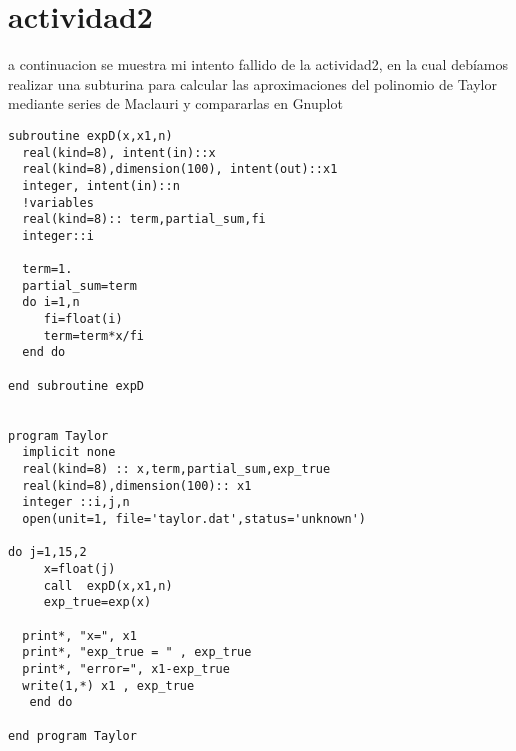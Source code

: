\documentclass{article}
\begin{document}
\section{actividad2}
a continuacion se muestra mi intento fallido de la actividad2, en la cual debíamos realizar una subturina para calcular las aproximaciones del polinomio de Taylor mediante series de Maclauri y compararlas en Gnuplot
\begin{verbatim}
subroutine expD(x,x1,n)
  real(kind=8), intent(in)::x
  real(kind=8),dimension(100), intent(out)::x1
  integer, intent(in)::n
  !variables
  real(kind=8):: term,partial_sum,fi
  integer::i

  term=1.
  partial_sum=term
  do i=1,n
     fi=float(i)
     term=term*x/fi
  end do

end subroutine expD


program Taylor
  implicit none
  real(kind=8) :: x,term,partial_sum,exp_true
  real(kind=8),dimension(100):: x1
  integer ::i,j,n
  open(unit=1, file='taylor.dat',status='unknown')
  
do j=1,15,2
     x=float(j)
     call  expD(x,x1,n)
     exp_true=exp(x)
 
  print*, "x=", x1
  print*, "exp_true = " , exp_true
  print*, "error=", x1-exp_true
  write(1,*) x1 , exp_true
   end do

end program Taylor
\end{verbatim}
\end{document}
